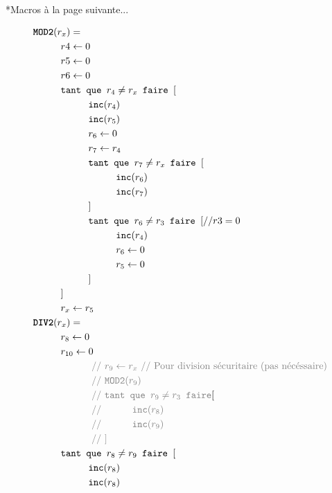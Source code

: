 \documentclass{article}
\newcommand{\key}[1]{\text{\texttt{#1}}}
\newcommand{\com}[1]{\text{\color{gray} \hspace{1cm} // #1}}
\newcommand{\name}[1]{\text{\bf \texttt{#1}}}
\newcommand\tab[1][1cm]{\hspace*{#1}}
\begin{document}
*Macros à la page suivante...

\begin{align*}
  &\name{MOD2}(r_x) =\\
  &\tab{}r4 \leftarrow 0\\
  &\tab{}r5 \leftarrow 0\\
  &\tab{}r6 \leftarrow 0\\
  &\tab{}\key{tant que } r_4 \neq r_x \key{ faire } [\\
    &\tab{}\tab{}\key{inc}(r_4)\\
    &\tab{}\tab{}\key{inc}(r_5)\\
    &\tab{}\tab{}r_6 \leftarrow 0\\
    &\tab{}\tab{}r_7 \leftarrow r_4\\
    &\tab{}\tab{}\key{tant que } r_7 \neq r_x \key{ faire } [\\
      &\tab{}\tab{}\tab{}\key{inc}(r_6)\\
      &\tab{}\tab{}\tab{}\key{inc}(r_7)\\
      &\tab{}\tab{}]\\
    &\tab{}\tab{}\key{tant que } r_6 \neq r_3 \key{ faire } [ // r3 = 0\\
      &\tab{}\tab{}\tab{}\key{inc}(r_4)\\
      &\tab{}\tab{}\tab{}r_6 \leftarrow 0\\
      &\tab{}\tab{}\tab{}r_5 \leftarrow 0\\
      &\tab{}\tab{}]\\
    &\tab{}]\\
  &\tab{}r_x \leftarrow r_5\\
  &\name{DIV2}(r_x) =\\
  &\tab{}r_8 \leftarrow 0\\
  &\tab{}r_{10} \leftarrow 0\\
  &\tab{}\com{$r_9 \leftarrow r_x$ // Pour division sécuritaire (pas nécéssaire)}\\
  &\tab{}\com{\key{MOD2}($r_9$)}\\
  &\tab{}\com{\key{tant que $r_9 \neq r_3$ faire}} [\\
    &\tab{}\com{\tab{}\key{inc}($r_8$)}\\
    &\tab{}\com{\tab{}\key{inc}($r_9$)}\\
    &\tab{}\com{]}\\
  &\tab{}\key{tant que } r_8 \neq r_9 \key{ faire } [\\
    &\tab{}\tab{}\key{inc}(r_8)\\
    &\tab{}\tab{}\key{inc}(r_8)\\

\end{align*}
\end{document}
